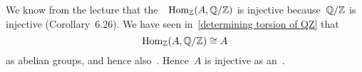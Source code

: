 \section{}

We know from the lecture that the~{}~$\operatorname{Hom}_{\mathbb{Z}}(A,\mathbb{Q}/\mathbb{Z})$ is injective because~$\mathbb{Q}/\mathbb{Z}$ is injective (Corollary~6.26).
We have seen in~\eqref{determining torsion of QZ} that
\[
  \operatorname{Hom}_{\mathbb{Z}}(A,\mathbb{Q}/\mathbb{Z})
  \cong
  A
\]
as abelian groups, and hence also~.
Hence~$A$ is injective as an~.
